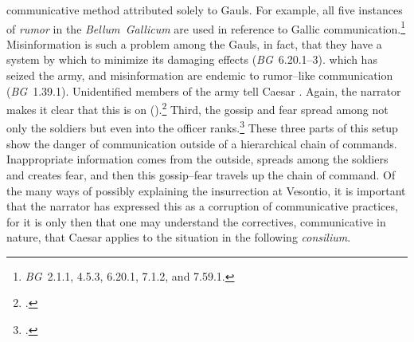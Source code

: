 \documentclass[12pt,letterpaper,oneside,final]{memoir}
\begin{document}
communicative method attributed solely to Gauls. For example, all five instances of \emph{rumor} in the \emph{Bellum~Gallicum} are used in reference to Gallic communication.\footnote{\emph{BG}~2.1.1, 4.5.3, 6.20.1, 7.1.2, and 7.59.1.} Misinformation is such a problem among the Gauls, in fact, that they have a system by which to minimize its damaging effects (\emph{BG}~6.20.1–3).  which has seized the army, and misinformation are endemic to rumor--like communication (\emph{BG}~1.39.1). Unidentified members of the army tell Caesar . Again, the narrator makes it clear that this is on  ().\footnote{.} Third, the gossip and fear spread among not only the soldiers but even into the officer ranks.\footnote{.} These three parts of this setup show the danger of communication outside of a hierarchical chain of commands. Inappropriate information comes from the outside, spreads among the soldiers and creates fear, and then this gossip--fear travels up the chain of command. Of the many ways of possibly explaining the insurrection at Vesontio, it is important that the narrator has expressed this as a corruption of communicative practices, for it is only then that one may understand the correctives, communicative in nature, that Caesar applies to the situation in the following \emph{consilium}.
\end{document}

